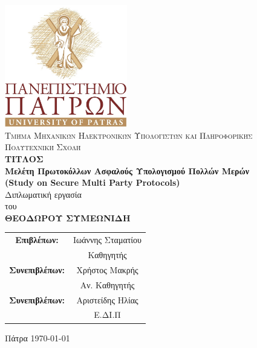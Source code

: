 \begin{titlepage}
    \begin{center}
        \includegraphics[width=0.4\textwidth]{00_preamble/images/upatras.jpg}
        \vspace*{1cm}
        \\ \textsc{Τμήμα Μηχανικών Ηλεκτρονικών Υπολογιστών και Πληροφορικής
        \\Πολυτεχνική Σχολή}
        \vspace{0.3cm}
    \large{
    \textbf{\\ΤΙΤΛΟΣ \\ Μελέτη Πρωτοκόλλων Ασφαλούς Υπολογισμού Πολλών Μερών
    \\ (Study on Secure Multi Party Protocols)}}
        \vspace{0.5cm}
        \\Διπλωματική εργασία \\
        του\\
        \vspace{0.5cm}
        \textbf{ΘΕΟΔΩΡΟΥ ΣΥΜΕΩΝΙΔΗ}\\
        \vspace{1cm}
        
    \end{center}
    \begin{center}
        \begin{tabular}{ c c } 
            \textbf{Επιβλέπων:} & Ιωάννης Σταματίου \\ 
              & Καθηγητής  \\
            \textbf{Συνεπιβλέπων:} & Χρήστος Μακρής  \\ 
              & Αν. Καθηγητής \\ 
            \textbf{Συνεπιβλέπων:} & Αριστείδης Ηλίας \\ 
              & Ε.ΔΙ.Π \\ 

        \end{tabular}
    \end{center}
    \begin{center}
        \vfill
        Πάτρα \today
    \end{center}

\end{titlepage}